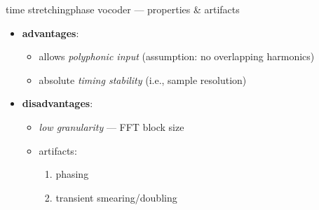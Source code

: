     \begin{frame}{time stretching}{phase vocoder --- properties \& artifacts}
        \begin{itemize}
            \item   \textbf{advantages}:
                \begin{itemize}
                    \item   allows \textit{polyphonic input} (assumption: no overlapping harmonics)
                    \item   absolute \textit{timing stability} (i.e., sample resolution)
                \end{itemize}   
            \pause
            \bigskip
            \item   \textbf{disadvantages}:
                \begin{itemize}
                    \item   \textit{low granularity} --- FFT block size
                    \item   artifacts:
                        \begin{enumerate}
                            \item   phasing
                            \item   transient smearing/doubling
                        \end{enumerate}
                \end{itemize}
        \end{itemize}
    \end{frame}

